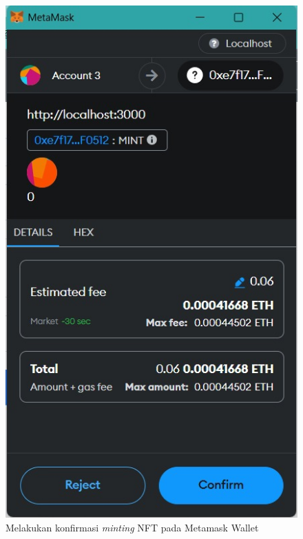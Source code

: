 \begin{itemize}
        \begin{figure} [H] \centering
          \includegraphics[scale=0.3]{gambar/confirm_create.jpg}
          \caption{Melakukan konfirmasi \emph{minting} NFT pada Metamask Wallet}
          \label{fig:makenft}
          \end{figure}
      

\end{itemize}
